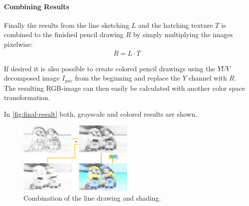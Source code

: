 \paragraph{Combining Results}
Finally the results from the line sketching $L$ and the hatching texture $T$ is
combined to the finished pencil drawing $R$ by simply multiplying the images
pixelwise:
\begin{align*}
  R = L  \cdot T
\end{align*}

If desired it is also possible to create colored pencil drawings using the $YUV$
decomposed image $I_{yuv}$ from the beginning and replace the $Y$ channel with
$R$. The resulting RGB-image can then easily be calculated with another color
space transformation.

In \autoref{fig:final-result} both, grayscale and colored results are shown.

\begin{figure}[htb]
  \centering
  \includegraphics[width=0.5\textwidth]{images/final-result.png}
  \caption{Combination of the line drawing and shading.}
  \label{fig:final-result}
\end{figure}
